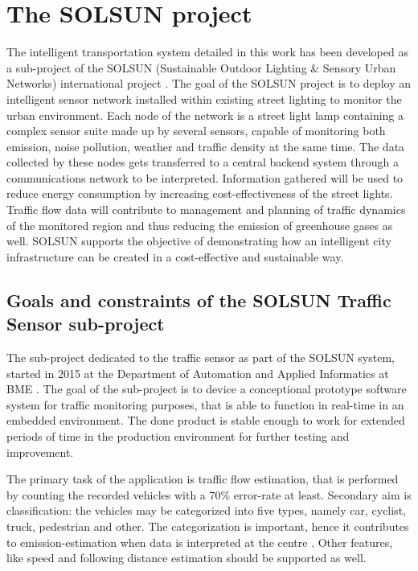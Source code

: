 \section{The SOLSUN project}
The intelligent transportation system detailed in this work has been developed as a sub-project of the SOLSUN (Sustainable Outdoor Lighting \& Sensory Urban Networks) international project \cite{SOLSUN}.
The goal of the SOLSUN project is to deploy an intelligent sensor network installed within existing street lighting to monitor the urban environment.
Each node of the network is a street light lamp containing a complex sensor suite made up by several sensors, capable of monitoring both emission, noise pollution, weather and traffic density at the same time.
The data collected by these nodes gets transferred to a central backend system through a communications network to be interpreted.
Information gathered will be used to reduce energy consumption by increasing cost-effectiveness of the street lights.
Traffic flow data will contribute to management and planning of traffic dynamics of the monitored region and thus reducing the emission of greenhouse gases as well.
SOLSUN supports the objective of demonstrating how an intelligent city infrastructure can be created in a cost-effective and sustainable way.

\subsection{Goals and constraints of the SOLSUN Traffic Sensor sub-project}\label{sec:constraints}
The sub-project dedicated to the traffic sensor as part of the SOLSUN system, started in 2015 at the Department of Automation and Applied Informatics at BME \cite{SOLSUN_BME}.
The goal of the sub-project is to device a conceptional prototype software system for traffic monitoring purposes, that is able to function in real-time in an embedded environment.
The done product is stable enough to work for extended periods of time in the production environment for further testing and improvement.

The primary task of the application is traffic flow estimation, that is performed by counting the recorded vehicles with a 70\% error-rate at least.
Secondary aim is classification: the vehicles may be categorized into five types, namely car, cyclist, truck, pedestrian and other.
The categorization is important, hence it contributes to emission-estimation when data is interpreted at the centre \cite{Csorba2016}.
Other features, like speed and following distance estimation should be supported as well.

